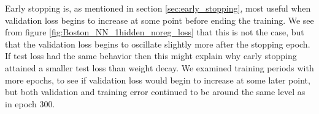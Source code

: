 Early stopping is, as mentioned in section \ref{sec:early_stopping}, most useful when validation loss begins to increase at some point before ending the training. We see from figure \ref{fig:Boston_NN_1hidden_noreg_loss} that this is not the case, but that the validation loss begins to oscillate slightly more after the stopping epoch. If test loss had the same behavior then this might explain why early stopping attained a smaller test loss than weight decay. We examined training periods with more epochs, to see if validation loss would begin to increase at some later point, but both validation and training error continued to be around the same level as in epoch 300. 
\begin{table}[h!]
\caption{Performance measurement for neural network models on Boston Housing data. Early stopping ran 255 epochs with patience 10 and $\delta_{\text{min}}=0.1$. For weight decay on all networks we select $\alpha = 0.3$ as the regularization constant. The Python code used to implement these neural networks can be seen in appendix \ref{app:Boston_NN}}
\label{tab:Boston_NN_performance}
\end{table}
